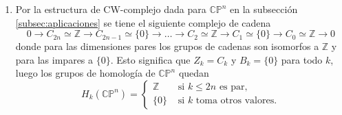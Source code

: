 \begin{example}
\begin{enumerate}[label=(\roman*)]
        Ambas $1$-celdas se pegan al $0$-esqueleto en $e^0$, ambas son lazos luego 
        \begin{equation*}
            \partial_1(e^1_1) = \partial_1(e^1_2) = e^0 - e^0 = 0.
        \end{equation*}
        Por lo que $Z_1(T^2)=C_1(T^2)\simeq \mathbb{Z}^2$. De esta manera, se tiene 
        \begin{equation*}
            H_2(T^2)=Z_2/B_2 = \mathbb{Z}/\{0\} = \mathbb{Z} ~\text{ y }~ H_1(T^2)=Z_1/B_1= \mathbb{Z}^2/\{0\} = \mathbb{Z}^2.
        \end{equation*}

        Y $H_0(T^2)\simeq \mathbb{Z}$ por ser conexo por caminos.
        \item Por la estructura de CW-complejo dada para $\mathbb{CP}^n$ en la subsección \ref{subsec:aplicaciones} se tiene el siguiente complejo de cadena
        \begin{equation*}
            0\to C_{2n}\simeq \mathbb{Z} \to C_{2n-1}\simeq \{0\}\to \dots \to C_{2}\simeq \mathbb{Z} \to C_1\simeq \{0\}\to C_0 \simeq \mathbb{Z}\to 0 
        \end{equation*}
        donde para las dimensiones pares los grupos de cadenas son isomorfos a $\mathbb{Z}$ y para las impares a $\{0\}$. Esto significa que $Z_k = C_k$ y $B_k = \{0\}$ para todo $k$, luego los grupos de homología de $\mathbb{CP}^n$ quedan
        \begin{equation*}
            H_k(\mathbb{CP}^n) =
            \begin{cases}
                \mathbb{Z} &\text{ si } k\le 2n \text{ es par},\\
                \{0\} &\text{ si } k \text{ toma otros valores}.
            \end{cases}
        \end{equation*}
    \end{enumerate}
\end{example}

\bigskip

